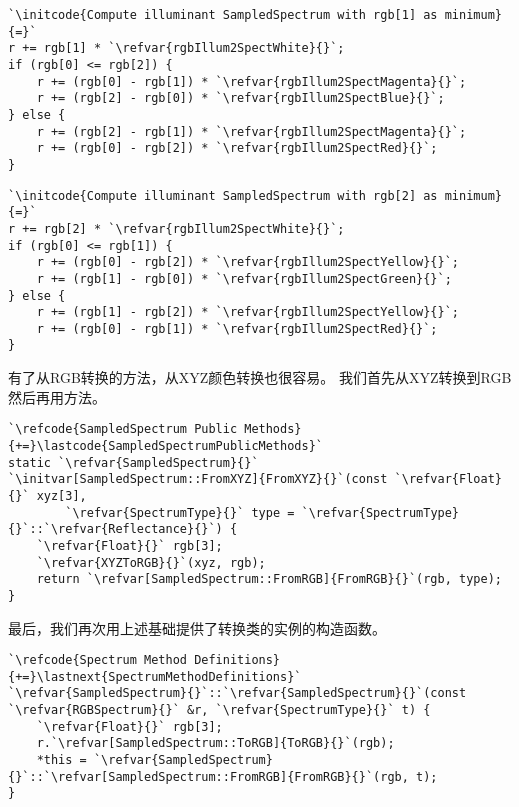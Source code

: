 \begin{lstlisting}
`\initcode{Compute illuminant SampledSpectrum with rgb[1] as minimum}{=}`
r += rgb[1] * `\refvar{rgbIllum2SpectWhite}{}`;
if (rgb[0] <= rgb[2]) {
    r += (rgb[0] - rgb[1]) * `\refvar{rgbIllum2SpectMagenta}{}`;
    r += (rgb[2] - rgb[0]) * `\refvar{rgbIllum2SpectBlue}{}`;
} else {
    r += (rgb[2] - rgb[1]) * `\refvar{rgbIllum2SpectMagenta}{}`;
    r += (rgb[0] - rgb[2]) * `\refvar{rgbIllum2SpectRed}{}`;
}
\end{lstlisting}
\begin{lstlisting}
`\initcode{Compute illuminant SampledSpectrum with rgb[2] as minimum}{=}`
r += rgb[2] * `\refvar{rgbIllum2SpectWhite}{}`;
if (rgb[0] <= rgb[1]) {
    r += (rgb[0] - rgb[2]) * `\refvar{rgbIllum2SpectYellow}{}`;
    r += (rgb[1] - rgb[0]) * `\refvar{rgbIllum2SpectGreen}{}`;
} else {
    r += (rgb[1] - rgb[2]) * `\refvar{rgbIllum2SpectYellow}{}`;
    r += (rgb[0] - rgb[1]) * `\refvar{rgbIllum2SpectRed}{}`;
}
\end{lstlisting}

有了从RGB转换的方法，从XYZ颜色转换也很容易。
我们首先从XYZ转换到RGB然后再用方法。
\begin{lstlisting}
`\refcode{SampledSpectrum Public Methods}{+=}\lastcode{SampledSpectrumPublicMethods}`
static `\refvar{SampledSpectrum}{}` `\initvar[SampledSpectrum::FromXYZ]{FromXYZ}{}`(const `\refvar{Float}{}` xyz[3],
        `\refvar{SpectrumType}{}` type = `\refvar{SpectrumType}{}`::`\refvar{Reflectance}{}`) {
    `\refvar{Float}{}` rgb[3];
    `\refvar{XYZToRGB}{}`(xyz, rgb);
    return `\refvar[SampledSpectrum::FromRGB]{FromRGB}{}`(rgb, type);
}
\end{lstlisting}

最后，我们再次用上述基础提供了转换类的实例的构造函数。
\begin{lstlisting}
`\refcode{Spectrum Method Definitions}{+=}\lastnext{SpectrumMethodDefinitions}`
`\refvar{SampledSpectrum}{}`::`\refvar{SampledSpectrum}{}`(const `\refvar{RGBSpectrum}{}` &r, `\refvar{SpectrumType}{}` t) {
    `\refvar{Float}{}` rgb[3];
    r.`\refvar[SampledSpectrum::ToRGB]{ToRGB}{}`(rgb);
    *this = `\refvar{SampledSpectrum}{}`::`\refvar[SampledSpectrum::FromRGB]{FromRGB}{}`(rgb, t);
}
\end{lstlisting}